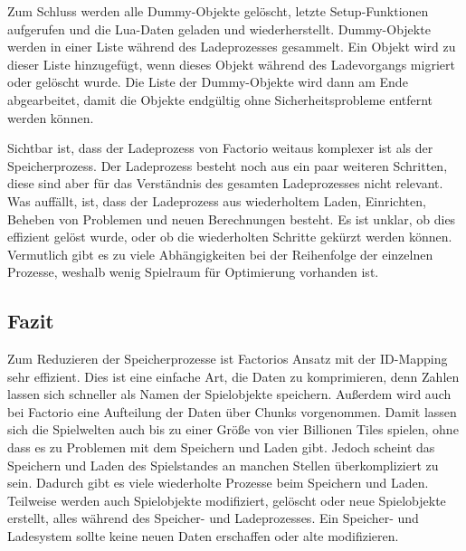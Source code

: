 Zum Schluss werden alle Dummy-Objekte gelöscht, letzte Setup-Funktionen aufgerufen und die Lua-Daten geladen und wiederherstellt. Dummy-Objekte werden in einer Liste während des Ladeprozesses gesammelt. Ein Objekt wird zu dieser Liste hinzugefügt, wenn dieses Objekt während des Ladevorgangs migriert oder gelöscht wurde. Die Liste der Dummy-Objekte wird dann am Ende abgearbeitet, damit die Objekte endgültig ohne Sicherheitsprobleme entfernt werden können.\cite{factorioGithubSaveLoad}

Sichtbar ist, dass der Ladeprozess von Factorio weitaus komplexer ist als der Speicherprozess. Der Ladeprozess besteht noch aus ein paar weiteren Schritten, diese sind aber für das Verständnis des gesamten Ladeprozesses nicht relevant. Was auffällt, ist, dass der Ladeprozess aus wiederholtem Laden, Einrichten, Beheben von Problemen und neuen Berechnungen besteht. Es ist unklar, ob dies effizient gelöst wurde, oder ob die wiederholten Schritte gekürzt werden können. Vermutlich gibt es zu viele Abhängigkeiten bei der Reihenfolge der einzelnen Prozesse, weshalb wenig Spielraum für Optimierung vorhanden ist.



\subsection{Fazit}
Zum Reduzieren der Speicherprozesse ist Factorios Ansatz mit der ID-Mapping sehr effizient. Dies ist eine einfache Art, die Daten zu komprimieren, denn Zahlen lassen sich schneller als Namen der Spielobjekte speichern. Außerdem wird auch bei Factorio eine Aufteilung der Daten über Chunks vorgenommen. Damit lassen sich die Spielwelten auch bis zu einer Größe von vier Billionen Tiles spielen, ohne dass es zu Problemen mit dem Speichern und Laden gibt. Jedoch scheint das Speichern und Laden des Spielstandes an manchen Stellen überkompliziert zu sein. Dadurch gibt es viele wiederholte Prozesse beim Speichern und Laden. Teilweise werden auch Spielobjekte modifiziert, gelöscht oder neue Spielobjekte erstellt, alles während des Speicher- und Ladeprozesses. Ein Speicher- und Ladesystem sollte keine neuen Daten erschaffen oder alte modifizieren.



